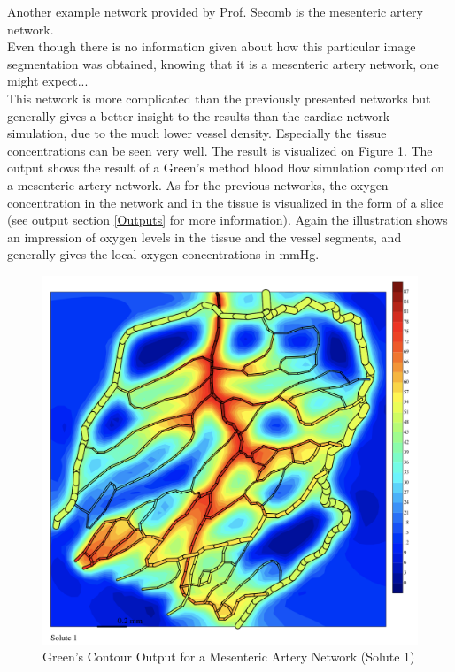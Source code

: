 Another example network provided by Prof. Secomb is the mesenteric artery network.
\\Even though there is no information given about how this particular image segmentation was obtained, knowing that it is a mesenteric artery network, one might expect...
\\This network is more complicated than the previously presented networks but generally gives a better insight to the results than the cardiac network simulation, due to the much lower vessel density. Especially the tissue concentrations can be seen very well. The result is visualized on Figure \ref{fig:Contour_Mesent1}. The output shows the result of a Green's method blood flow simulation computed on a mesenteric artery network. As for the previous networks, the oxygen concentration in the network and in the tissue is visualized in the form of a slice (see output section \ref{Outputs} for more information). Again the illustration shows an impression of oxygen levels in the tissue and the vessel segments, and generally gives the local oxygen concentrations in mmHg.
\begin{figure}[h]
\centering
\includegraphics[width=120mm]{Contour_Mesent1}
\caption{\footnotesize Green's Contour Output for a Mesenteric Artery Network (Solute 1)}
\label{fig:Contour_Mesent1}
\end{figure}
%
